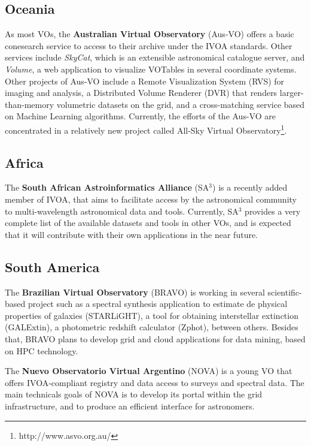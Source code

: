 

\subsection{Oceania}
As most VOs, the \textbf{Australian Virtual Observatory} (Aus-VO) offers a 
basic conesearch service to access to their archive under the
IVOA standards. Other
services include \emph{SkyCat}, which is an extensible 
astronomical catalogue server, 
and \emph{Volume}, a web application to visualize VOTables in several 
coordinate systems.
Other projects of Aus-VO include a Remote Visualization
System (RVS) for imaging and analysis, a 	
Distributed Volume Renderer (DVR) that renders larger-than-memory volumetric 
datasets on the grid,
and a cross-matching service based on Machine Learning algorithms.
Currently, the efforts of the Aus-VO are concentrated in a relatively
new project called All-Sky Virtual 
Observatory\footnote{http://www.asvo.org.au/}.

\subsection{Africa}
The \textbf{South African Astroinformatics Alliance} (SA$^3$) 
is a recently added member of IVOA, that aims 
to facilitate access by the astronomical community to
multi-wavelength astronomical data and tools.
Currently, SA$^3$ provides a very complete list of the available datasets and
tools in other VOs, and is expected that it will contribute with their own
applications in the near future.

\subsection{South America}

The \textbf{Brazilian Virtual Observatory} (BRAVO) is working in several
scientific-based project such as a spectral synthesis application to
estimate de physical properties of galaxies (STARLiGHT), a tool 
for obtaining interstellar extinction (GALExtin), a photometric redshift
calculator (Zphot), between others. Besides that, BRAVO plans to develop
grid and cloud applications for data mining, based on HPC technology.

The \textbf{Nuevo Observatorio Virtual Argentino} (NOVA) is a young
VO that offers IVOA-compliant registry and data access to surveys and
spectral data. The main technicals goals of NOVA is to develop its portal
within the grid infrastructure, and to produce an efficient interface for
astronomers.

